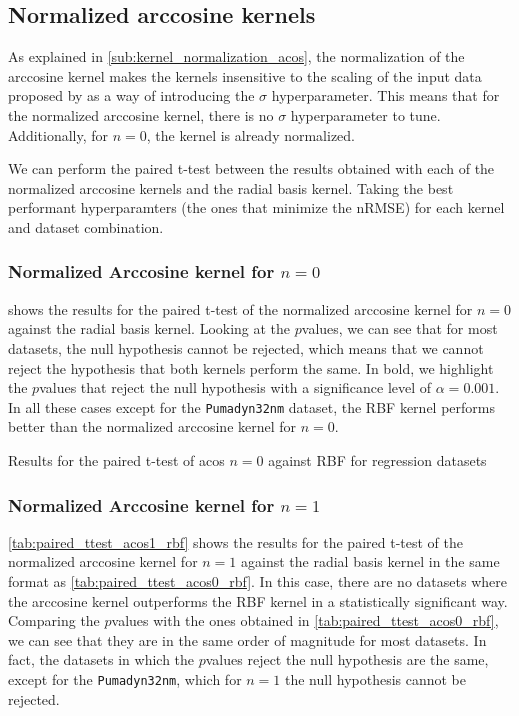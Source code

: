

\subsection{Normalized arccosine kernels}

As explained in \cref{sub:kernel_normalization_acos}, the normalization of the
arccosine kernel makes the kernels insensitive to the scaling of the input data
proposed by \cite{pandeyGoDeepWide2014} as a way of introducing the $\sigma$
hyperparameter. This means that for the normalized arccosine kernel, there is
no $\sigma$ hyperparameter to tune. Additionally, for $n=0$, the kernel is
already normalized.

We can perform the paired t-test between the results obtained with each of the
normalized arccosine kernels and the radial basis kernel. Taking the best
performant hyperparamters (the ones that minimize the nRMSE) for each kernel and
dataset combination.

\subsubsection{Normalized Arccosine kernel for $n=0$}

 shows the results for the paired t-test of
the normalized arccosine kernel for $n=0$ against the radial basis kernel. Looking
at the $p$\textendash{}values, we can see that for most datasets, the null hypothesis
cannot be rejected, which means that we cannot reject the hypothesis that both
kernels perform the same. In bold, we highlight the $p$\textendash{}values that
reject the null hypothesis with a significance level of $\alpha = 0.001$. In all
these cases except for the \texttt{Pumadyn32nm} dataset, the RBF kernel performs
better than the normalized arccosine kernel for $n=0$.

\begin{table}[H]
    \caption{Results for the paired t-test of acos $n=0$ against RBF for regression datasets}
    \label{tab:paired_ttest_acos0_rbf}
    
\end{table}

\subsubsection{Normalized Arccosine kernel for $n=1$}

\cref{tab:paired_ttest_acos1_rbf} shows the results for the paired t-test of
the normalized arccosine kernel for $n=1$ against the radial basis kernel in the
same format as \cref{tab:paired_ttest_acos0_rbf}. In this case, there are no
datasets where the arccosine kernel outperforms the RBF kernel in a statistically
significant way. Comparing the $p$\textendash{}values with the ones obtained
in \cref{tab:paired_ttest_acos0_rbf}, we can see that they are in the same order
of magnitude for most datasets. In fact, the datasets in which the $p$\textendash{}values
reject the null hypothesis are the same, except for the \texttt{Pumadyn32nm}, which
for $n=1$ the null hypothesis cannot be rejected.

